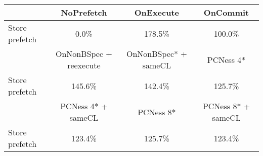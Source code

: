 \begin{tabular}{ l|ccc }
 & NoPrefetch & OnExecute & OnCommit\\ \hline
Store prefetch & 0.0\% & 178.5\% & 100.0\%\\ \hline
\hline
 & OnNonBSpec + reexecute & OnNonBSpec* + sameCL & PCNess 4*\\ \hline
Store prefetch & 145.6\% & 142.4\% & 125.7\%\\ \hline
\hline
 & PCNess 4* + sameCL & PCNess 8* & PCNess 8* + sameCL\\ \hline
Store prefetch & 123.4\% & 125.7\% & 123.4\%\\ \hline
\end{tabular}

